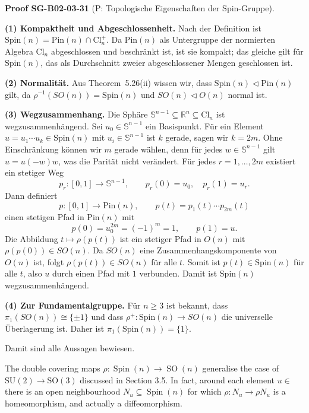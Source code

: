 \documentclass[10pt, letterpaper]{article}
\newcommand{\R}{\mathbb{R}}
\newcommand{\Cl}{\mathrm{Cl}}
\newcommand{\Spin}{\mathrm{Spin}}
\newcommand{\Pin}{\mathrm{Pin}}
\newcommand{\CustomHeading}[3]{%
  \par\medskip\noindent%
  \textbf{#1 #2} \textnormal{(#3)}.\enskip%
}
\newenvironment{PROOF}[2]{\begin{unitbox}\CustomHeading{Proof}{#1}{#2}}{\end{unitbox}}
\begin{document}
\begin{PROOF}{SG-B02-03-31}{P: Topologische Eigenschaften der Spin-Gruppe}
\textbf{(1) Kompaktheit und Abgeschlossenheit.}
Nach der Definition ist \(\Spin(n)=\Pin(n)\cap\Cl_n^+\).
Da \(\Pin(n)\) als Untergruppe der normierten Algebra \(\Cl_n\) abgeschlossen und beschränkt ist, 
ist sie kompakt; das gleiche gilt für \(\Spin(n)\), das als Durchschnitt zweier abgeschlossener Mengen geschlossen ist.

\smallskip
\textbf{(2) Normalität.}
Aus Theorem~5.26(ii) wissen wir, dass \(\Spin(n)\lhd\Pin(n)\) gilt, da \(\rho^{-1}(SO(n))=\Spin(n)\)
und \(SO(n)\lhd O(n)\) normal ist.

\smallskip
\textbf{(3) Wegzusammenhang.}
Die Sphäre \(\mathbb S^{n-1}\subseteq\R^n\subseteq\Cl_n\) ist wegzusammenhängend. 
Sei \(u_0\in\mathbb S^{n-1}\) ein Basispunkt.
Für ein Element \(u=u_1\cdots u_k\in\Spin(n)\) mit \(u_i\in\mathbb S^{n-1}\)
ist \(k\) gerade, sagen wir \(k=2m\). 
Ohne Einschränkung können wir \(m\) gerade wählen, denn
für jedes \(w\in\mathbb S^{n-1}\) gilt \(u=u(-w)w\), was die Parität nicht verändert.
Für jedes \(r=1,\dots,2m\) existiert ein stetiger Weg 
\[
p_r:[0,1]\to\mathbb S^{n-1},\qquad p_r(0)=u_0,\quad p_r(1)=u_r.
\]
Dann definiert
\[
p:[0,1]\to\Pin(n),\qquad p(t)=p_1(t)\cdots p_{2m}(t)
\]
einen stetigen Pfad in \(\Pin(n)\) mit
\[
p(0)=u_0^{2m}=(-1)^m=1,\qquad p(1)=u.
\]
Die Abbildung \(t\mapsto\rho(p(t))\) ist ein stetiger Pfad in \(O(n)\)
mit \(\rho(p(0))\in SO(n)\).
Da \(SO(n)\) eine Zusammenhangskomponente von \(O(n)\) ist, folgt
\(\rho(p(t))\in SO(n)\) für alle \(t\).
Somit ist \(p(t)\in\Spin(n)\) für alle \(t\), also \(u\) durch einen Pfad mit \(1\) verbunden.
Damit ist \(\Spin(n)\) wegzusammenhängend.

\smallskip
\textbf{(4) Zur Fundamentalgruppe.}
Für \(n\ge3\) ist bekannt, dass \(\pi_1(SO(n))\cong\{\pm1\}\)
und dass \(\rho^{+}:\Spin(n)\to SO(n)\) die universelle Überlagerung ist.
Daher ist \(\pi_1(\Spin(n))=\{1\}\).

\smallskip
Damit sind alle Aussagen bewiesen.
\end{PROOF}




The double covering maps $\rho: \operatorname{Spin}(n) \longrightarrow \operatorname{SO}(n)$ generalise the case of $\mathrm{SU}(2) \longrightarrow \mathrm{SO}(3)$ discussed in Section 3.5. In fact, around each element $u \in$ there is an open neighbourhood $N_{u} \subseteq \operatorname{Spin}(n)$ for which $\rho: N_{u} \longrightarrow \rho N_{u}$ is a homeomorphism, and actually a diffeomorphism. 
\end{document}
